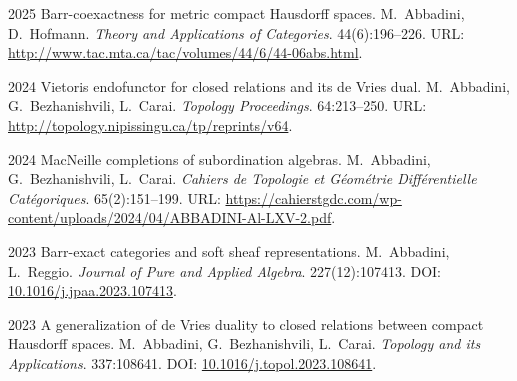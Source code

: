 \pubrow
  {2025}
  {Barr-coexactness for metric compact Hausdorff spaces.}
  {M.\ Abbadini, D.\ Hofmann.}
  {\emph{Theory and Applications of Categories}. 44(6):196--226. URL: \url{http://www.tac.mta.ca/tac/volumes/44/6/44-06abs.html}.}

\pubrow
  {2024}
  {Vietoris endofunctor for closed relations and its de Vries dual.}
  {M.\ Abbadini, G.\ Bezhanishvili, L.\ Carai.}
  {\emph{Topology Proceedings}. 64:213--250. URL: \url{http://topology.nipissingu.ca/tp/reprints/v64}.}

\pubrow
  {2024}
  {MacNeille completions of subordination algebras.}
  {M.\ Abbadini, G.\ Bezhanishvili, L.\ Carai.}
  {\emph{Cahiers de Topologie et Géométrie Différentielle Catégoriques}. 65(2):151--199. URL: \url{https://cahierstgdc.com/wp-content/uploads/2024/04/ABBADINI-Al-LXV-2.pdf}.}

\pubrow
  {2023}
  {Barr-exact categories and soft sheaf representations.}
  {M.\ Abbadini, L.\ Reggio.}
  {\emph{Journal of Pure and Applied Algebra}. 227(12):107413. DOI: \href{https://doi.org/10.1016/j.jpaa.2023.107413}{10.1016/j.jpaa.2023.107413}.}

\pubrow
  {2023}
  {A generalization of de Vries duality to closed relations between compact Hausdorff spaces.}
  {M.\ Abbadini, G.\ Bezhanishvili, L.\ Carai.}
  {\emph{Topology and its Applications}. 337:108641. DOI: \href{https://doi.org/10.1016/j.topol.2023.108641}{10.1016/j.topol.2023.108641}.}

